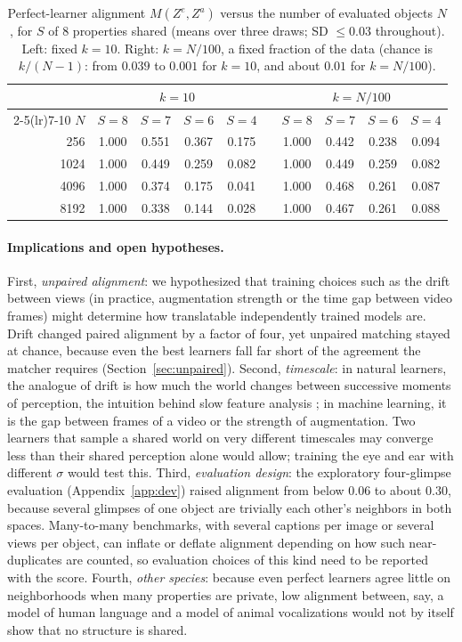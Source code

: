 \documentclass[11pt]{article}
\begin{document}
\begin{table}[t]
  \centering
  \small
  \caption{Perfect-learner alignment $M(Z^e,Z^a)$ versus the number of evaluated objects $N$, for $S$ of 8 properties shared (means over three draws; SD $\leq 0.03$ throughout). Left: fixed $k=10$. Right: $k=N/100$, a fixed fraction of the data (chance is $k/(N-1)$: from $0.039$ to $0.001$ for $k=10$, and about $0.01$ for $k=N/100$).}
  \label{tab:scale}
  \begin{tabular}{r cccc c cccc}
    \toprule
    & \multicolumn{4}{c}{$k=10$} && \multicolumn{4}{c}{$k=N/100$} \\
    \cmidrule(lr){2-5}\cmidrule(lr){7-10}
    $N$ & $S=8$ & $S=7$ & $S=6$ & $S=4$ && $S=8$ & $S=7$ & $S=6$ & $S=4$ \\
    \midrule
    256  & 1.000 & 0.551 & 0.367 & 0.175 && 1.000 & 0.442 & 0.238 & 0.094 \\
    1024 & 1.000 & 0.449 & 0.259 & 0.082 && 1.000 & 0.449 & 0.259 & 0.082 \\
    4096 & 1.000 & 0.374 & 0.175 & 0.041 && 1.000 & 0.468 & 0.261 & 0.087 \\
    8192 & 1.000 & 0.338 & 0.144 & 0.028 && 1.000 & 0.467 & 0.261 & 0.088 \\
    \bottomrule
  \end{tabular}
\end{table}

\paragraph{Implications and open hypotheses.} First, \emph{unpaired alignment}: we hypothesized that training choices such as the drift between views (in practice, augmentation strength or the time gap between video frames) might determine how translatable independently trained models are. Drift changed paired alignment by a factor of four, yet unpaired matching stayed at chance, because even the best learners fall far short of the agreement the matcher requires (Section~\ref{sec:unpaired}). Second, \emph{timescale}: in natural learners, the analogue of drift is how much the world changes between successive moments of perception, the intuition behind slow feature analysis \citep{wiskott2002slow}; in machine learning, it is the gap between frames of a video or the strength of augmentation. Two learners that sample a shared world on very different timescales may converge less than their shared perception alone would allow; training the eye and ear with different $\sigma$ would test this. Third, \emph{evaluation design}: the exploratory four-glimpse evaluation (Appendix~\ref{app:dev}) raised alignment from below $0.06$ to about $0.30$, because several glimpses of one object are trivially each other's neighbors in both spaces. Many-to-many benchmarks, with several captions per image or several views per object, can inflate or deflate alignment depending on how such near-duplicates are counted, so evaluation choices of this kind need to be reported with the score. Fourth, \emph{other species}: because even perfect learners agree little on neighborhoods when many properties are private, low alignment between, say, a model of human language and a model of animal vocalizations would not by itself show that no structure is shared.
\end{document}
